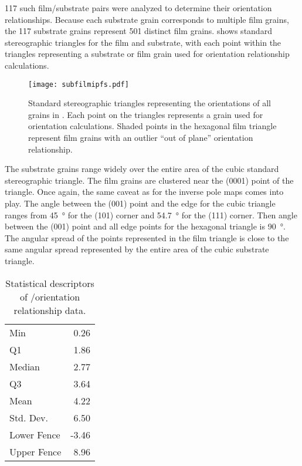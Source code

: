 117 such film/substrate pairs were analyzed to determine their orientation relationships.
Because each substrate grain corresponds to multiple film grains, the 117 substrate grains
represent 501 distinct film grains.  shows standard stereographic
triangles for the film and substrate, with each point within the triangles representing a
substrate or film grain used for orientation relationship calculations.
\begin{figure}
	\texttt{[image: subfilmipfs.pdf]}
		\caption[Orientation of film and substrate grains]{%
			Standard stereographic triangles representing the orientations
			of all grains in . Each point on the 
			triangles represents a grain used for orientation calculations.
			Shaded points in the hexagonal film triangle represent film grains
			with an outlier ``out of plane'' orientation relationship.}
	\label{fig:subfilmipfs}
\end{figure}
The substrate grains range widely over the entire area of the cubic standard stereographic
triangle. The film grains are clustered near the (0001) point of the triangle. Once again,
the same caveat as for the inverse pole maps comes into play. The angle between the (001)
point and the edge for the cubic triangle ranges from \SI{45}{\degree} for the (101)
corner and \SI{54.7}{\degree} for the (111) corner. Then angle between the (001) point and
all edge points for the hexagonal triangle is \SI{90}{\degree}. The angular spread of the
points represented in the film triangle is close to the same angular spread represented by
the entire area of the cubic substrate triangle.
\begin{table}
	
	\begin{center}
\begin{tabular}{lr}
	
		Min &
		0.26 \\
		
		Q1 &
		1.86 \\
		
		Median &
		2.77 \\
		
		Q3 &
		3.64 \\
		
		Mean &
		4.22 \\
		
		Std. Dev. &
		6.50 \\
		
		Lower Fence &
		-3.46 \\
		
		Upper Fence &
		8.96 \\
		
	\end{tabular}

\end{center}	\caption[Statistical descriptors of orientation relationship
data]{Statistical descriptors of \feo[0001]/\sto[111] orientation relationship data.}
	\label{tab:outofplanestats}


\end{table}

